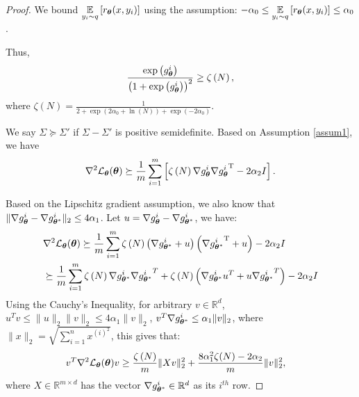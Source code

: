 \begin{proof}
We  bound $\operatorname*{\mathbb{E}}\limits_{y_{i}\sim q}\left[{r_{{\boldsymbol{\theta}}}(x,y_{i})}\right]$ using the assumption:
$-\alpha_{0}\leq\operatorname*{\mathbb{E}}\limits_{y_{i}\sim q}\left[{r_{{\boldsymbol{\theta}}}(x,y_{i})}\right]\leq\alpha_{0}$.

Thus, \begin{equation*}
\frac{\exp\left(g^{i}_{{\boldsymbol{\theta}}}\right)}{\left(1+\exp\left(g^{i}_{{\boldsymbol{\theta}}}\right)\right)^{2}} \geq \zeta\left(N\right),
\end{equation*}
where $\zeta\left(N\right)=\frac{1}{2+\exp\left(2\alpha_{0}+\ln(N)\right)+\exp\left(-2\alpha_{0}\right)}$.

We say $\Sigma \succeq \Sigma'$ if $\Sigma-\Sigma'$ is positive semidefinite. Based on Assumption \ref{assum1}, we have
\begin{equation}
\nabla^{2} \mathcal{L}_{{\boldsymbol{\theta}}}({\boldsymbol{\theta}}) \succeq \frac{1}{m}\sum\limits^{m}_{i=1}\left[\zeta\left(N\right)\nabla g^{i}_{{\boldsymbol{\theta}}}\nabla {g^{i}_{{\boldsymbol{\theta}}}}^{\text{T}}-2\alpha_{2}I\right].
\end{equation}

Based on the Lipschitz gradient assumption, we also know that $\|\nabla g^{i}_{{\boldsymbol{\theta}}}-\nabla g^{i}_{{\boldsymbol{\theta}}^{*}}\|_{2}\leq 4\alpha_{1}$. Let $u=\nabla g^{i}_{{\boldsymbol{\theta}}}-\nabla g^{i}_{{\boldsymbol{\theta}}^{*}}$, we have:
\begin{equation*}
\begin{aligned}
&\nabla^{2} \mathcal{L}_{{\boldsymbol{\theta}}}({\boldsymbol{\theta}}) \succeq \frac{1}{m}\sum\limits^{m}_{i=1}\zeta\left(N\right)\left(\nabla g^{i}_{{\boldsymbol{\theta}}^{*}}+u\right)\left(\nabla {g^{i}_{{\boldsymbol{\theta}}^{*}}}^{\text{T}}+u\right)-2\alpha_{2}I \\
& \succeq \frac{1}{m}\sum\limits^{m}_{i=1}\zeta\left(N\right)\nabla g^{i}_{{\boldsymbol{\theta}}^{*}}\nabla {g^{i}_{{\boldsymbol{\theta}}^{*}}}^{T}+\zeta\left(N\right)\left(\nabla g^{i}_{{\boldsymbol{\theta}}^{*}}u^{T}+u\nabla {g^{i}_{{\boldsymbol{\theta}}^{*}}}^{T}\right)-2\alpha_{2}I
\end{aligned}
\end{equation*}
Using the Cauchy's Inequality, for arbitrary $v\in\mathbb{R}^{d}$, $u^{T}v\leq\|u\|_{2}\|v\|_{2}\leq4\alpha_{1}\|v\|_{2}$, $v^{T}\nabla g^{i}_{{\boldsymbol{\theta}}^{*}}\leq \alpha_{1}\|v\|_{2}$, where $\|x\|_{2} = \sqrt{\sum_{i=1}^{n} x^{\left(i\right)^{2}}}$, this gives that:
\begin{equation*}
\begin{aligned}
&v^{T}\nabla^{2} \mathcal{L}_{{\boldsymbol{\theta}}}({\boldsymbol{\theta}})v\geq\frac{\zeta\left(N\right)}{m}\|Xv\|_{2}^{2}+\frac{8\alpha_{1}^{2}\zeta(N)-2\alpha_{2}}{m}\|v\|_{2}^{2},
\end{aligned}
\end{equation*}
where $X\in\mathbb{R}^{m\times d}$ has the vector $\nabla g^{i}_{{\boldsymbol{\theta}}^{*}}\in \mathbb{R}^{d}$ as its $i^{th}$ row.


\end{proof}
